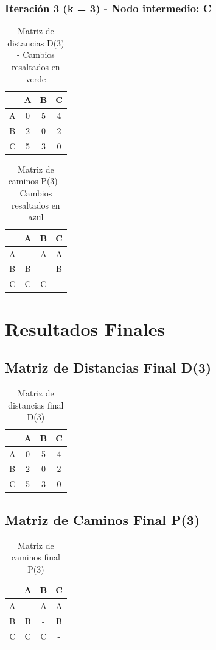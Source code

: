 \documentclass[12pt]{article}
\begin{document}
\subsubsection{Iteración 3 (k = 3) - Nodo intermedio: C}
\begin{table}[h!]
\centering
\begin{tabular}{|c|c|c|c|}
\hline
 & A & B & C \\\hline
A & 0 & 5 & 4 \\\hline
B & 2 & 0 & 2 \\\hline
C & 5 & 3 & 0 \\\hline
\end{tabular}
\caption{Matriz de distancias D(3) - Cambios resaltados en verde}
\end{table}

\begin{table}[h!]
\centering
\begin{tabular}{|c|c|c|c|}
\hline
 & A & B & C \\\hline
A & - & A & A \\\hline
B & B & - & B \\\hline
C & C & C & - \\\hline
\end{tabular}
\caption{Matriz de caminos P(3) - Cambios resaltados en azul}
\end{table}

\clearpage
\section{Resultados Finales}
\subsection{Matriz de Distancias Final D(3)}
\begin{table}[h!]
\centering
\begin{tabular}{|c|c|c|c|}
\hline
 & A & B & C \\\hline
A & 0 & 5 & 4 \\\hline
B & 2 & 0 & 2 \\\hline
C & 5 & 3 & 0 \\\hline
\end{tabular}
\caption{Matriz de distancias final D(3)}
\end{table}

\clearpage
\subsection{Matriz de Caminos Final P(3)}
\begin{table}[h!]
\centering
\begin{tabular}{|c|c|c|c|}
\hline
 & A & B & C \\\hline
A & - & A & A \\\hline
B & B & - & B \\\hline
C & C & C & - \\\hline
\end{tabular}
\caption{Matriz de caminos final P(3)}
\end{table}
\end{document}

